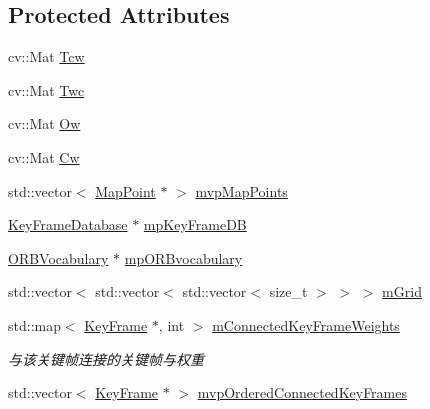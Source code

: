 \subsection*{Protected Attributes}
\begin{DoxyCompactItemize}
\item 
cv\+::\+Mat \mbox{\hyperlink{class_o_r_b___s_l_a_m2_1_1_key_frame_a8dc31ef9a08d34ecb196f3e58a2c09b9}{Tcw}}
\item 
cv\+::\+Mat \mbox{\hyperlink{class_o_r_b___s_l_a_m2_1_1_key_frame_a769de03e37e9531ab43625250287ff8c}{Twc}}
\item 
cv\+::\+Mat \mbox{\hyperlink{class_o_r_b___s_l_a_m2_1_1_key_frame_a3044f098f2b7d25b33b180b20c5a5fa6}{Ow}}
\item 
cv\+::\+Mat \mbox{\hyperlink{class_o_r_b___s_l_a_m2_1_1_key_frame_a4666bde848e4fbabf327e5ec0804e80e}{Cw}}
\item 
std\+::vector$<$ \mbox{\hyperlink{class_o_r_b___s_l_a_m2_1_1_map_point}{Map\+Point}} $\ast$ $>$ \mbox{\hyperlink{class_o_r_b___s_l_a_m2_1_1_key_frame_a777aab9cb7c1fd8e83f143e77a9f1b03}{mvp\+Map\+Points}}
\item 
\mbox{\hyperlink{class_o_r_b___s_l_a_m2_1_1_key_frame_database}{Key\+Frame\+Database}} $\ast$ \mbox{\hyperlink{class_o_r_b___s_l_a_m2_1_1_key_frame_a0d0f82c40703deb82fbc593d9e17ea1a}{mp\+Key\+Frame\+DB}}
\item 
\mbox{\hyperlink{namespace_o_r_b___s_l_a_m2_a2fafba714858cab1bb18d438e2e83c5d}{O\+R\+B\+Vocabulary}} $\ast$ \mbox{\hyperlink{class_o_r_b___s_l_a_m2_1_1_key_frame_ab268c7bd221fb11554a9f21f56a5550a}{mp\+O\+R\+Bvocabulary}}
\item 
std\+::vector$<$ std\+::vector$<$ std\+::vector$<$ size\+\_\+t $>$ $>$ $>$ \mbox{\hyperlink{class_o_r_b___s_l_a_m2_1_1_key_frame_aa01e44ecc9b907b3f85094d84de08cb8}{m\+Grid}}
\item 
std\+::map$<$ \mbox{\hyperlink{class_o_r_b___s_l_a_m2_1_1_key_frame}{Key\+Frame}} $\ast$, int $>$ \mbox{\hyperlink{class_o_r_b___s_l_a_m2_1_1_key_frame_a6a057195e3e9e7d3f08b97b6366e9f81}{m\+Connected\+Key\+Frame\+Weights}}
\begin{DoxyCompactList}\small\item\em 与该关键帧连接的关键帧与权重 \end{DoxyCompactList}\item 
std\+::vector$<$ \mbox{\hyperlink{class_o_r_b___s_l_a_m2_1_1_key_frame}{Key\+Frame}} $\ast$ $>$ \mbox{\hyperlink{class_o_r_b___s_l_a_m2_1_1_key_frame_af4a83f5b32cf53c0ad87702226b9dff8}{mvp\+Ordered\+Connected\+Key\+Frames}}

\end{DoxyCompactItemize}
